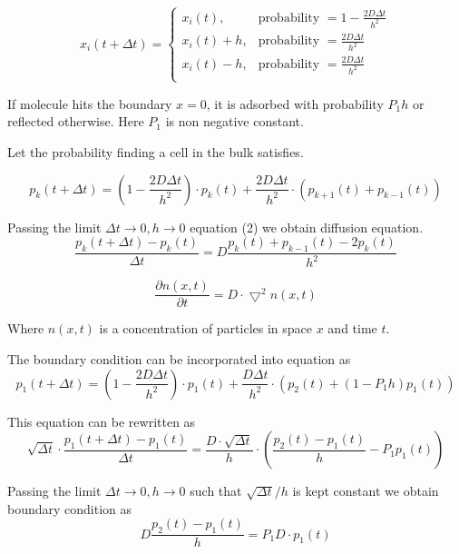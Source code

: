 \documentclass[10pt, oneside]{article}
\begin{document}
\begin{equation}
x_i(t+\Delta t)=\begin{cases}
x_i(t), &\text{probability $=1-\frac{2D\Delta t}{h^{2}} $}\\
x_i(t)+h,  &\text{probability $=\frac{2 D \Delta t}{h^{2}} $}\\
x_i(t)-h,  &\text{probability $=\frac{2 D \Delta t}{h^{2}} $}\\
\end{cases}	
\end{equation}

If molecule hits the boundary $x=0$, it is adsorbed with probability $P_1h$ or reflected otherwise. Here $ P_1$ is non negative constant.

Let the probability finding a cell in the bulk satisfies.

\begin{equation}
p_k(t+\Delta t)=(1-\dfrac{2D\Delta t }{h^{2}})\cdot p_k(t)+
\dfrac{2D\Delta t }{h^{2}} \cdot (p_{k+1}(t) + p_{k-1}(t))
\end{equation}

Passing the limit $\Delta t \rightarrow 0,  h\rightarrow 0$ equation (2) 
we obtain diffusion equation.
\begin{equation}
\frac{p_k(t+\Delta t)-p_k(t)}{\Delta t}=
D \frac{p_k(t)+p_{k-1}(t)-2p_k(t)}{h^{2}}
\end{equation}

\begin{equation}
\frac{\partial n(x,t)}{ \partial t}=
D \cdot \bigtriangledown^2 n(x,t)
\end{equation}

Where $n(x,t)$ is a concentration of particles in space $x$ and time $t$.



The boundary condition can be incorporated into equation as 
\begin{equation}
p_1(t+\Delta t)=(1-\dfrac{2D\Delta t }{h^{2}})\cdot p_1(t)+
\dfrac{D\Delta t }{h^{2}} \cdot (p_{2}(t) +(1-P_1h) p_{1}(t))
\end{equation}

This equation can be rewritten as
\begin{equation}
\sqrt{\Delta t} \cdot \frac{p_1(t+\Delta t)-p_1(t)}{\Delta t}=
\frac{D \cdot \sqrt{\Delta t}}{h}  \cdot
\left (\frac{p_2(t)-p_1(t)}{h}-P_1p_1(t) \right )
\end{equation} 

Passing the limit $\Delta t \rightarrow 0,  h\rightarrow 0$  such that $ \sqrt{\Delta t}/h$ is kept constant we obtain boundary condition as
\begin{equation}
D\frac{p_2(t)-p_1(t)}{h}=P_1D \cdot p_1(t) 
\end{equation}
\end{document}
